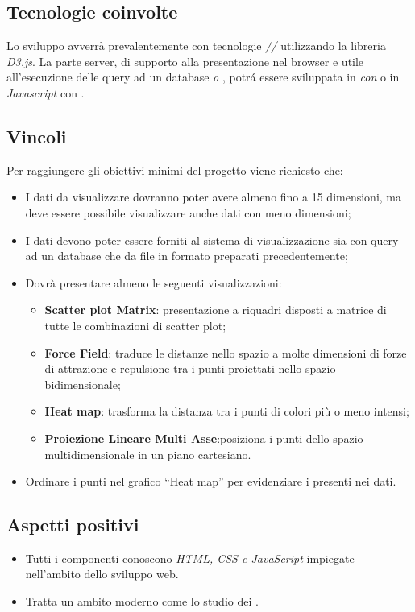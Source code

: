 \subsection{Tecnologie coinvolte}
Lo sviluppo avverrà prevalentemente con tecnologie \textit{//} utilizzando la libreria \textit{D3.js}.
La parte server, di supporto alla presentazione nel browser e utile all'esecuzione delle query ad un database \textit{ o }, potr\'a essere sviluppata in \textit{ con } o in \textit{Javascript} con \textit{}.

\subsection{Vincoli}
Per raggiungere gli obiettivi minimi del progetto viene richiesto che:
\begin{itemize}
	\item I dati da visualizzare dovranno poter avere almeno fino a 15 dimensioni, ma deve essere possibile visualizzare anche dati con meno dimensioni;
	\item I dati devono poter essere forniti al sistema di visualizzazione sia con query ad un database che da file in formato  preparati precedentemente;
	\item Dovrà presentare almeno le seguenti visualizzazioni:
	\begin{itemize}
		\item \textbf{Scatter plot Matrix}: presentazione a riquadri disposti a matrice di tutte le combinazioni di scatter plot;
		\item \textbf{Force Field}: traduce le distanze nello spazio a molte dimensioni di forze di attrazione e repulsione tra i punti proiettati nello spazio bidimensionale;
		\item \textbf{Heat map}: trasforma la distanza tra i punti di colori più o meno intensi;
		\item \textbf{Proiezione Lineare Multi Asse}:posiziona i punti dello spazio multidimensionale in un piano
		cartesiano.
	\end{itemize}
	\item Ordinare i punti nel grafico “Heat map” per evidenziare i  presenti nei dati.
\end{itemize}

\subsection{Aspetti positivi}
\begin{itemize}
	\item Tutti i componenti conoscono \textit{HTML, CSS e JavaScript} impiegate nell'ambito dello sviluppo web.
	\item Tratta un ambito moderno come lo studio dei .
\end{itemize}

